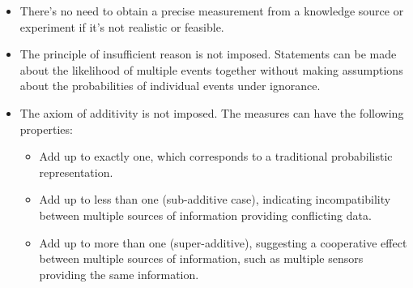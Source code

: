 \begin{itemize}
    \item There's no need to obtain a precise measurement from a knowledge source or experiment if it's not realistic or feasible.
    \item The principle of insufficient reason is not imposed. 
        Statements can be made about the likelihood of multiple events together without making assumptions about the probabilities of individual events under ignorance.
    \item The axiom of additivity is not imposed. 
        The measures can have the following properties:
        \begin{itemize}
            \item Add up to exactly one, which corresponds to a traditional probabilistic representation.
            \item Add up to less than one (sub-additive case), indicating incompatibility between multiple sources of information providing conflicting data.
            \item Add up to more than one (super-additive), suggesting a cooperative effect between multiple sources of information, such as multiple sensors providing the same information.
        \end{itemize}
\end{itemize}

